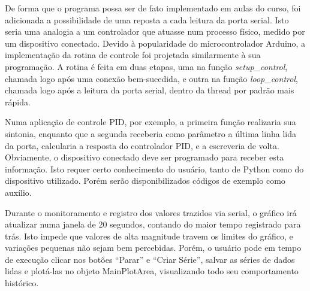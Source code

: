 De forma que o programa possa ser de fato implementado em aulas do curso, foi adicionada a possibilidade de uma reposta a cada leitura da porta serial. Isto seria uma analogia a um controlador que atuasse num processo físico, medido por um dispositivo conectado. Devido à popularidade do microcontrolador Arduino, a implementação da rotina de controle foi projetada similarmente à sua programação. A rotina é feita em duas etapas, uma na função \emph{setup\_control}, chamada logo após uma conexão bem-sucedida, e outra na função \emph{loop\_control}, chamada logo após a leitura da porta serial, dentro da thread por padrão mais rápida.

Numa aplicação de controle PID, por exemplo, a primeira função realizaria sua sintonia, enquanto que a segunda receberia como parâmetro a última linha lida da porta, calcularia a resposta do controlador PID, e a escreveria de volta. Obviamente, o dispositivo conectado deve ser programado para receber esta informação. Isto requer certo conhecimento do usuário, tanto de Python como do dispositivo utilizado. Porém serão disponibilizados códigos de exemplo como auxílio.

Durante o monitoramento e registro dos valores trazidos via serial, o gráfico irá atualizar numa janela de 20 segundos, contando do maior tempo registrado para trás. Isto impede que valores de alta magnitude travem os limites do gráfico, e variações pequenas não sejam bem percebidas. Porém, o usuário pode em tempo de execução clicar nos botões “Parar” e “Criar Série”, salvar as séries de dados lidas e plotá-las no objeto MainPlotArea, visualizando todo seu comportamento histórico.